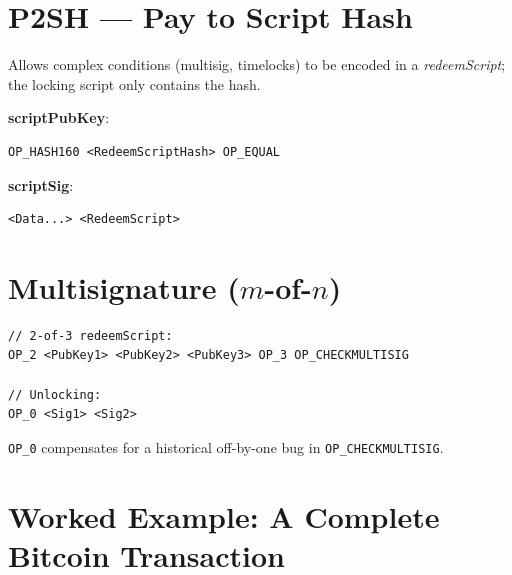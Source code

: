 \documentclass[12pt,a4paper,openany]{book}
\theoremstyle{definition}
\theoremstyle{plain}
\theoremstyle{remark}
\begin{document}
\section{P2SH — Pay to Script Hash}

Allows complex conditions (multisig, timelocks) to be encoded in a
\emph{redeemScript}; the locking script only contains the hash.

\textbf{scriptPubKey}:
\begin{lstlisting}[language={}]
OP_HASH160 <RedeemScriptHash> OP_EQUAL
\end{lstlisting}

\textbf{scriptSig}:
\begin{lstlisting}[language={}]
<Data...> <RedeemScript>
\end{lstlisting}

\section{Multisignature ($m$-of-$n$)}

\begin{lstlisting}[language={}]
// 2-of-3 redeemScript:
OP_2 <PubKey1> <PubKey2> <PubKey3> OP_3 OP_CHECKMULTISIG

// Unlocking:
OP_0 <Sig1> <Sig2>
\end{lstlisting}

\texttt{OP\_0} compensates for a historical off-by-one bug in
\texttt{OP\_CHECKMULTISIG}.

\section{Worked Example: A Complete Bitcoin Transaction}
\end{document}
